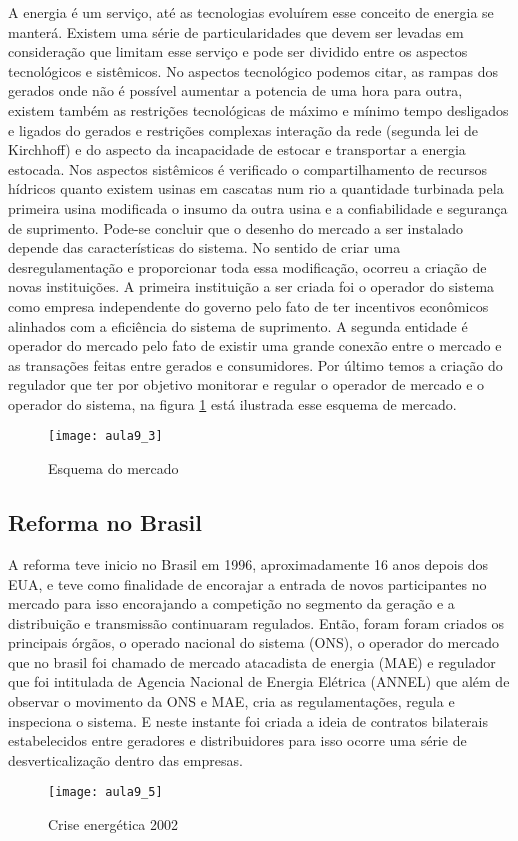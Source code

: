   A energia é um serviço, até as tecnologias evoluírem esse conceito de energia se manterá. Existem uma série de particularidades que devem ser levadas em consideração que limitam esse serviço e pode ser dividido entre os aspectos tecnológicos e sistêmicos. No aspectos tecnológico podemos citar, as rampas dos gerados onde não é possível aumentar a potencia de uma hora para outra, existem também as restrições tecnológicas de máximo e mínimo tempo desligados e ligados do gerados e restrições complexas interação da rede (segunda lei de  Kirchhoff) e do aspecto da incapacidade de estocar e transportar a energia estocada. Nos aspectos sistêmicos é verificado o compartilhamento de recursos hídricos quanto existem usinas em cascatas num rio a quantidade turbinada pela primeira usina modificada o insumo da outra usina e a confiabilidade e segurança de suprimento. Pode-se concluir que o desenho do mercado a ser instalado depende das características do sistema.
  No sentido de criar uma desregulamentação e proporcionar toda essa modificação, ocorreu a criação de novas instituições. A primeira instituição a ser criada foi o operador do sistema como empresa independente do governo pelo fato de ter incentivos econômicos alinhados com a eficiência do sistema de suprimento. A segunda entidade é operador do mercado pelo fato de existir uma grande conexão entre o mercado e as transações feitas entre gerados e consumidores. Por último temos a criação do regulador que ter por objetivo monitorar e regular o operador de mercado e o operador do sistema, na figura \ref{fig:aula9-3} está ilustrada esse esquema de mercado.

\begin{figure}[H]
\begin{centering}
\texttt{[image: aula9\_3]}\protect\caption{\label{fig:aula9-3} Esquema do mercado }
\end{centering}
\end{figure}
\subsection{Reforma no Brasil}

 A reforma teve inicio no Brasil em 1996, aproximadamente 16 anos depois dos EUA, e teve como finalidade de encorajar a entrada de novos participantes no mercado para isso encorajando a competição no segmento da geração e a distribuição e transmissão continuaram regulados. Então, foram foram criados os principais órgãos, o operado nacional do sistema (ONS), o operador do mercado que no brasil foi chamado de mercado atacadista de energia (MAE) e regulador que foi intitulada de Agencia Nacional de Energia Elétrica (ANNEL) que além de observar o movimento da ONS e MAE, cria as regulamentações, regula e inspeciona o sistema. E neste instante foi criada a ideia de contratos bilaterais estabelecidos entre geradores e distribuidores para isso ocorre uma série de desverticalização dentro das empresas.
 \begin{figure}[H]
\begin{centering}
\texttt{[image: aula9\_5]}\protect\caption{\label{fig:aula9-5} Crise energética 2002}
\end{centering}
\end{figure}


